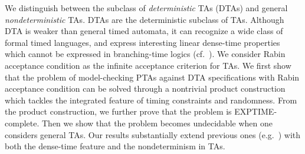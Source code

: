 \smallskip
{} We distinguish between the subclass of \emph{deterministic} TAs (DTAs) and general \emph{nondeterministic} TAs.
DTAs are the deterministic subclass of TAs.
Although DTA is weaker than general timed automata, it can recognize a wide class of formal timed languages, and express interesting linear dense-time properties which cannot be expressed in branching-time logics (cf.~\cite{DBLP:journals/tse/DonatelliHS09}).
We consider Rabin acceptance condition as the infinite acceptance criterion for TAs. 
We first show that the problem of model-checking PTAs against DTA specifications with Rabin acceptance condition
can be solved through a nontrivial product construction which tackles the integrated feature of timing constraints and randomness. From the product construction, we further prove that the problem is EXPTIME-complete.
Then we show that the problem becomes undecidable when one considers general TAs.
Our results substantially extend previous ones (e.g.~\cite{DBLP:conf/qest/Sproston11}) with both the dense-time feature and the nondeterminism in TAs.





